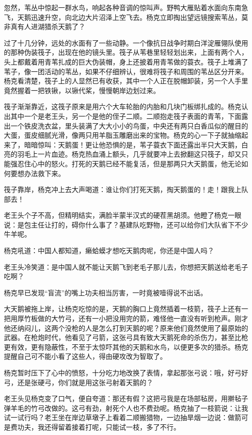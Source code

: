 \par 忽然，苇丛中惊起一群水鸟，响起各种音调的惊叫声。野鸭大雁贴着水面向东南急飞，天鹅迅速升空，向北边大片沼泽上空飞去。杨克立即掏出望远镜搜索苇丛，莫非真有人进湖猎杀天鹅了？
\par 过了十几分钟，远处的水面有了一些动静。一个像抗日战争时期白洋淀雁翎队使用的那种伪装筏子，出现在他的镜头里。筏子从苇巷里轻轻划出来，上面有两个人，头上都戴着用青苇扎成的巨大伪装帽，身上还披着用青苇做的蓑衣。筏子上堆满了苇子，像一团活动的苇丛，如果不仔细辨认，很难将筏子和周围的苇丛区分开来。杨克看清楚，筏子上的人显然已有收获，其中一个人正在脱帽卸装，另一个人手里竟然握着一把铁锹，以锹代桨，慢慢朝岸边划过来。
\par 筏子渐渐靠近，这筏子原来是用六个大车轮胎的内胎和几块门板绑扎成的。杨克认出其中一个是老王头，另一个是他的侄子二顺。二顺抱走筏子表面的青苇，下面露出一个铁皮洗衣盆，里头装满了大大小小的鸟蛋，中央还有两只白香瓜似的醒目的大蛋，蛋皮细腻光滑，像两只用羊脂玉雕磨出来的宝物。杨克的心一下子就抽缩起来了，暗暗惊叫：天鹅蛋！更让他恐惧的是，苇子蓑衣下面还露出半只大天鹅，白亮的羽毛上一片血迹。杨克热血涌上额头，几乎就要冲上去掀翻这只筏子，却又只能强忍住心中的怒火。打死的天鹅已经不能复活，但是那两只大天鹅蛋，他无论如何要想办法救下来。
\par 筏子靠岸，杨克冲上去大声喝道：谁让你们打死天鹅，掏天鹅蛋的！走！跟我上队部去！
\par 老王头个子不高，但精明结实，满脸半蒙半汉式的硬茬黑胡须。他瞪了杨克一眼说：是包主任让打的，碍你什么事了？基建队吃野物，还可以给你们大队省下不少牛羊呢。
\par 杨克吼道：中国人都知道，癞蛤蟆才想吃天鹅肉呢，你还是中国人吗？
\par 老王头冷笑道：是中国人就不能让天鹅飞到老毛子那儿去，你想把天鹅送给老毛子吃啊？
\par 杨克早已发现“盲流”的嘴上功夫相当厉害，一时竟被噎得说不出话。
\par 大天鹅被拖上岸，让杨克吃惊的是，天鹅的胸口上竟然插着一枝箭，筏子上还有一把用厚竹板做的大竹弓，还有一小把没用完的箭，难怪他一直没有听到枪声。刚才他还纳闷儿，这两个没枪的人是怎么打到天鹅的呢？原来他们竟然使用了最原始的武器。在枪炮时代，他看见了弓箭，这张弓具有致大天鹅死命的杀伤力，甚至比枪更有效，更有隐蔽性，不至于太惊吓其他的天鹅和水鸟，以便更多次的猎杀。杨克提醒自己可不能小看了这些人，得由硬攻改为智取了。
\par 杨克暂时压下了心中的愤怒，十分吃力地改换了表情，拿起那张弓说：哦，好弓好弓，还是张硬弓，你们就是用这张弓射着天鹅的？
\par 老王头见杨克变了口气，便自夸道：那还有假？这把弓我是在场部毡房，用擀毡子弹羊毛的竹弓改做的。这弓有劲，射死个人也不费劲呢。杨克抽了一枝箭说：让我试一试行吗？老王坐在岸边草墩子上看着二顺搬猎物，一边抽旱烟一边说：做箭可是费功夫，我还得留着接着打呢，只能试一枝，多了不行。
